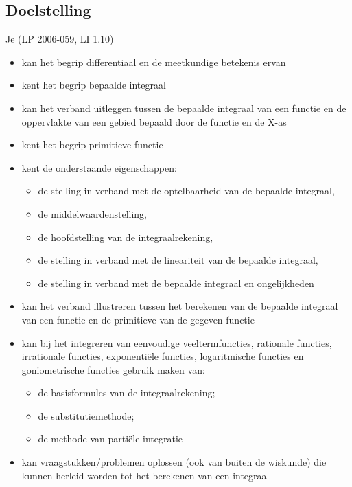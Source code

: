 \documentclass[a4paper,12pt]{article}
\begin{document}
\begin{theorie}
{\subsection*{Doelstelling}
Je \hfill  {\scriptsize(LP 2006-059, LI 1.10)}
\begin{itemize}
  \item kan het begrip differentiaal en de meetkundige betekenis ervan
  \item kent het begrip bepaalde integraal
  \item kan het verband uitleggen tussen de bepaalde integraal van een functie en de oppervlakte van een gebied bepaald door de functie en de X-as
  \item kent het begrip primitieve functie
  \item kent de onderstaande eigenschappen:
  \begin{itemize}
    \item de stelling in verband met de optelbaarheid van de bepaalde integraal,
    \item de middelwaardenstelling,
    \item de hoofdstelling van de integraalrekening,
    \item de stelling in verband met de lineariteit van de bepaalde integraal,
    \item de stelling in verband met de bepaalde integraal en ongelijkheden
  \end{itemize}
  \item kan het verband illustreren tussen het berekenen van de bepaalde integraal van een functie en de primitieve van de gegeven functie
  \item kan bij het integreren van eenvoudige veeltermfuncties, rationale functies, irrationale functies, exponentiële functies, logaritmische functies en goniometrische functies gebruik maken van:
  \begin{itemize}
    \item de basisformules van de integraalrekening;
    \item de substitutiemethode;
    \item de methode van partiële integratie
  \end{itemize}
  \item kan vraagstukken/problemen oplossen (ook van buiten de wiskunde) die kunnen herleid worden tot het berekenen van een integraal
\end{itemize}
}

\pagestyle{empty}
\mbox{}
\newpage
\clearpage
\thispagestyle{empty}
{\small \tableofcontents}
\newpage
\clearpage
{}

\pagestyle{fancy}
\lhead{}

\end{theorie}
\end{document}
